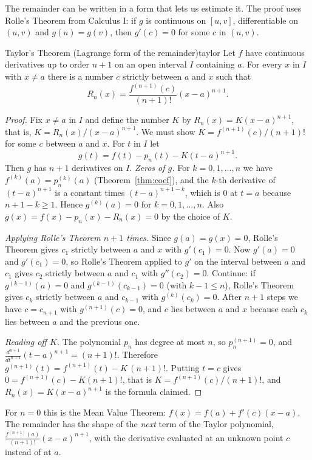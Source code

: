 \documentclass[11pt]{article}
\begin{document}
The remainder can be written in a form that lets us estimate it. The proof uses Rolle's Theorem from Calculus I: if $g$ is continuous on $[u,v]$, differentiable on $(u,v)$ and $g(u)=g(v)$, then $g'(c)=0$ for some $c$ in $(u,v)$.

\begin{thm}{Taylor's Theorem (Lagrange form of the remainder)}{taylor}
Let $f$ have continuous derivatives up to order $n+1$ on an open interval $I$ containing $a$. For every $x$ in $I$ with $x\ne a$ there is a number $c$ strictly between $a$ and $x$ such that
\[
R_n(x)=\frac{f^{(n+1)}(c)}{(n+1)!}(x-a)^{n+1}.
\]
\end{thm}
\begin{proof}
Fix $x\ne a$ in $I$ and define the number $K$ by $R_n(x)=K(x-a)^{n+1}$, that is, $K=R_n(x)/(x-a)^{n+1}$. We must show $K=f^{(n+1)}(c)/(n+1)!$ for some $c$ between $a$ and $x$. For $t$ in $I$ let
\[
g(t)=f(t)-p_n(t)-K(t-a)^{n+1}.
\]
Then $g$ has $n+1$ derivatives on $I$. \emph{Zeros of $g$.} For $k=0,1,\dots,n$ we have $f^{(k)}(a)=p_n^{(k)}(a)$ (Theorem~\ref{thm:coef}), and the $k$-th derivative of $(t-a)^{n+1}$ is a constant times $(t-a)^{n+1-k}$, which is $0$ at $t=a$ because $n+1-k\ge1$. Hence $g^{(k)}(a)=0$ for $k=0,1,\dots,n$. Also $g(x)=f(x)-p_n(x)-R_n(x)=0$ by the choice of $K$.

\emph{Applying Rolle's Theorem $n+1$ times.} Since $g(a)=g(x)=0$, Rolle's Theorem gives $c_1$ strictly between $a$ and $x$ with $g'(c_1)=0$. Now $g'(a)=0$ and $g'(c_1)=0$, so Rolle's Theorem applied to $g'$ on the interval between $a$ and $c_1$ gives $c_2$ strictly between $a$ and $c_1$ with $g''(c_2)=0$. Continue: if $g^{(k-1)}(a)=0$ and $g^{(k-1)}(c_{k-1})=0$ (with $k-1\le n$), Rolle's Theorem gives $c_k$ strictly between $a$ and $c_{k-1}$ with $g^{(k)}(c_k)=0$. After $n+1$ steps we have $c=c_{n+1}$ with $g^{(n+1)}(c)=0$, and $c$ lies between $a$ and $x$ because each $c_k$ lies between $a$ and the previous one.

\emph{Reading off $K$.} The polynomial $p_n$ has degree at most $n$, so $p_n^{(n+1)}=0$, and $\frac{d^{n+1}}{dt^{n+1}}(t-a)^{n+1}=(n+1)!$. Therefore $g^{(n+1)}(t)=f^{(n+1)}(t)-K\,(n+1)!$. Putting $t=c$ gives $0=f^{(n+1)}(c)-K(n+1)!$, that is $K=f^{(n+1)}(c)/(n+1)!$, and $R_n(x)=K(x-a)^{n+1}$ is the formula claimed.
\end{proof}

For $n=0$ this is the Mean Value Theorem: $f(x)=f(a)+f'(c)(x-a)$. The remainder has the shape of the \emph{next} term of the Taylor polynomial, $\frac{f^{(n+1)}(a)}{(n+1)!}(x-a)^{n+1}$, with the derivative evaluated at an unknown point $c$ instead of at $a$.
\end{document}
